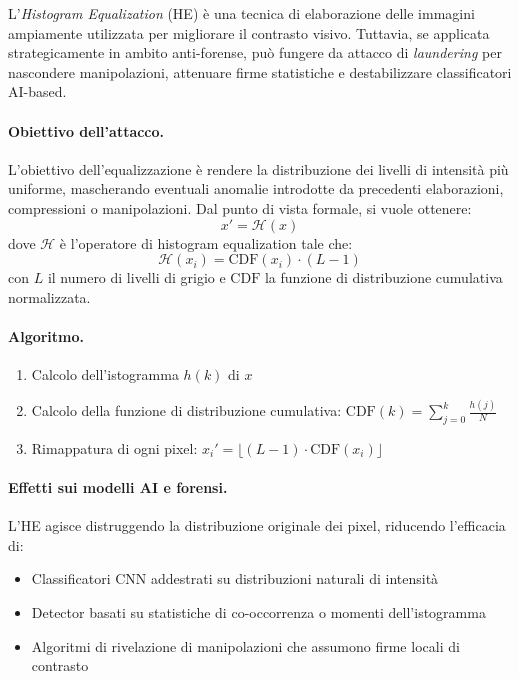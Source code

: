 L'\textit{Histogram Equalization} (HE) è una tecnica di elaborazione delle immagini ampiamente utilizzata per migliorare il contrasto visivo. Tuttavia, se applicata strategicamente in ambito anti-forense, può fungere da attacco di \textit{laundering} per nascondere manipolazioni, attenuare firme statistiche e destabilizzare classificatori AI-based.

\paragraph{Obiettivo dell’attacco.}
L'obiettivo dell'equalizzazione è rendere la distribuzione dei livelli di intensità più uniforme, mascherando eventuali anomalie introdotte da precedenti elaborazioni, compressioni o manipolazioni. Dal punto di vista formale, si vuole ottenere:
\[
x' = \mathcal{H}(x)
\]
dove $\mathcal{H}$ è l'operatore di histogram equalization tale che:
\[
\mathcal{H}(x_i) = \text{CDF}(x_i) \cdot (L - 1)
\]
con $L$ il numero di livelli di grigio e $\text{CDF}$ la funzione di distribuzione cumulativa normalizzata.

\paragraph{Algoritmo.}
\begin{enumerate}
    \item Calcolo dell’istogramma $h(k)$ di $x$
    \item Calcolo della funzione di distribuzione cumulativa: $\text{CDF}(k) = \sum_{j=0}^{k} \frac{h(j)}{N}$
    \item Rimappatura di ogni pixel: $x_i' = \lfloor (L-1) \cdot \text{CDF}(x_i) \rfloor$
\end{enumerate}



\paragraph{Effetti sui modelli AI e forensi.}
L’HE agisce distruggendo la distribuzione originale dei pixel, riducendo l’efficacia di:
\begin{itemize}
\item Classificatori CNN addestrati su distribuzioni naturali di intensità
\item Detector basati su statistiche di co-occorrenza o momenti dell’istogramma
\item Algoritmi di rivelazione di manipolazioni che assumono firme locali di contrasto
\end{itemize}


